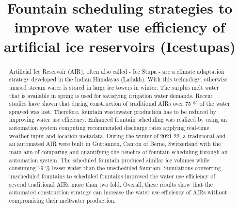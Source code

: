 \documentclass[tc, manuscript]{copernicus}
\begin{document}
\title{Fountain scheduling strategies to improve water use efficiency of artificial
ice reservoirs (Icestupas)}

\def\Authors{Suryanarayanan Balasubramanian\,$^{1,2}$, Martin Hoelzle\,$^{1}$Roger Waser\,$^{3}$, $Martin Von
Burg^{3}\,$}

\def\Address{$^{1}$University of Fribourg, Department of Geosciences, Fribourg, Switzerland $^{2}$University of
Applied Sciences and Arts, Luzern, Switzerland} \def\corrAuthor{Suryanarayanan Balasubramanian}





\maketitle

\begin{abstract}

  Artificial Ice Reservoir (AIR), often also called - Ice Stupa - are a climate adaptation strategy developed in
  the Indian Himalayas (Ladakh). With this technology, otherwise unused stream water is stored in large ice
  towers in winter. The surplus melt water that is available in spring is used for satisfying irrigation
  water demands. Recent studies have shown that during construction of traditional AIRs over 75 \% of the water
  sprayed was lost. Therefore, fountain wastewater production has to be reduced by improving water use
  efficiency. Enhanced fountain scheduling was realized by using an automation system computing recommended
  discharge rates applying real-time weather input and location metadata. During the winter of 2021-22, a
  traditional and an automated AIR were built in Guttannen, Canton of Berne, Switzerland with the main aim of
  comparing and quantifying the benefits of fountain scheduling through an automation system. The scheduled
  fountain produced similar ice volumes while consuming 79 \% lesser water than the unscheduled fountain.
  Simulations converting unscheduled fountains to scheduled fountains improved the water use efficiency of
  several traditional AIRs more than two fold. Overall, these results show that the automated construction
  strategy can increase the water use efficiency of AIRs without compromising their meltwater production.

\end{abstract}
\end{document}
